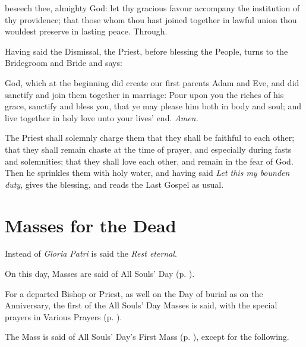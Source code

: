  beseech thee, almighty God: let thy gracious favour accompany the institution of thy providence; that those whom thou hast joined together in lawful union thou wouldest preserve in lasting peace. Through.

\begin{rubric}
    Having said the Dismissal, the Priest, before blessing the People, turns to the Bridegroom and Bride and says:
\end{rubric}
 God, which at the beginning did create our first parents Adam and Eve, and did sanctify and join them together in marriage: Pour upon you the riches of his grace, sanctify and {} bless you, that ye may please him both in body and soul; and live together in holy love unto your lives' end. \textit{Amen.}
\begin{rubric}
    The Priest shall solemnly charge them that they shall be faithful to each other; that they shall remain chaste at the time of prayer, and especially during fasts and solemnities; that they shall love each other, and remain in the fear of God. Then he sprinkles them with holy water, and having said \emph{Let this my bounden duty}, gives the blessing, and reads the Last Gospel as usual.
\end{rubric}

\clearpage
\section{Masses for the Dead}\label{RequiemMasses}
\fancyhead[RE,LO]{}
\begin{secrubric}
    Instead of \emph{Gloria Patri} is said the \emph{Rest eternal}.
\end{secrubric}
\vspace{-2ex}
\begin{rubric}
    On this day, Masses are said of All Souls' Day (p. \pageref{AllSouls}).
\end{rubric}
\begin{rubric}
    For a departed Bishop or Priest, as well on the Day of burial as on the Anniversary, the first of the All Souls' Day Masses is said, with the special prayers in Various Prayers (p. \pageref{RequiemPrayers}).
\end{rubric}

\begin{rubric}
    The Mass is said of All Souls' Day's First Mass (p. \pageref{AllSouls}), except for the following.
\end{rubric}

